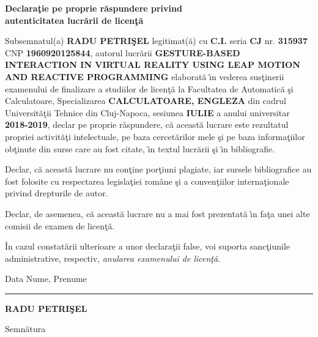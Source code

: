 \documentclass[12pt,a4paper,twoside]{report}
\renewcommand{\thesistitle}{GESTURE-BASED INTERACTION IN VIRTUAL REALITY USING LEAP MOTION AND REACTIVE PROGRAMMING}
\newcommand{\uline}[1]{\rule[0pt]{#1}{0.4pt}}
\begin{document}
\begin{center}
{\bf
Declara\c{t}ie pe proprie r\u{a}spundere privind\\ 
autenticitatea lucr\u{a}rii de licen\c{t}\u{a}}
\end{center}
\vspace{1cm}



Subsemnatul(a) \textbf{RADU PETRI\c{S}EL} legitimat(\u{a}) cu \textbf{C.I.} seria \textbf{CJ} nr. \textbf{315937} CNP \textbf{1960920125844}, autorul lucr\u{a}rii \textbf{\thesistitle{}} elaborat\u{a} \^{\i}n vederea sus\c{t}inerii examenului de finalizare a studiilor de licen\c{t}\u{a} la Facultatea de Automatic\u{a} \c{s}i Calculatoare, Specializarea \textbf{CALCULATOARE, ENGLEZA} din cadrul Universit\u{a}\c{t}ii Tehnice din Cluj-Napoca, sesiunea \textbf{IULIE} a anului universitar \textbf{2018-2019}, declar pe proprie r\u{a}spundere, c\u{a} aceast\u{a} lucrare este rezultatul propriei activit\u{a}\c{t}i intelectuale, pe baza cercet\u{a}rilor mele \c{s}i pe baza informa\c{t}iilor ob\c{t}inute din surse care au fost citate, \^{\i}n textul lucr\u{a}rii \c{s}i \^{\i}n bibliografie.

Declar, c\u{a} aceast\u{a} lucrare nu con\c{t}ine por\c{t}iuni plagiate, iar sursele bibliografice au fost folosite cu 
respectarea legisla\c{t}iei rom\^{a}ne \c{s}i a conven\c{t}iilor interna\c{t}ionale privind drepturile de autor.

Declar, de asemenea, c\u{a} aceast\u{a} lucrare nu a mai fost prezentat\u{a} \^{\i}n fa\c{t}a unei alte comisii de examen de licen\c{t}\u{a}.

\^{I}n cazul constat\u{a}rii ulterioare a unor declara\c{t}ii false, voi suporta sanc\c{t}iunile administrative, respectiv, \emph{anularea examenului de licen\c{t}\u{a}}.

\vspace{1.5cm}

Data \hspace{8cm} Nume, Prenume

\vspace{0.5cm}

\uline{3cm} \hspace{5cm} \textbf{RADU PETRI\c{S}EL}

\vspace{0.5cm}
\hspace{9.4cm}Semn\u{a}tura

\thispagestyle{empty}

\newpage
\end{document}
